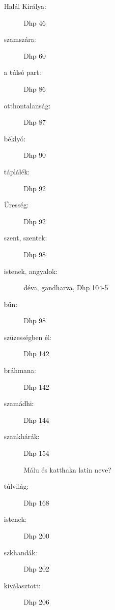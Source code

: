 \begin{description}
\item[Halál Királya:] Dhp 46


\item[szamszára:] Dhp 60


\item[a túlsó part:] Dhp 86

\item[otthontalanság:] Dhp 87


\item[béklyó:] Dhp 90

\item[táplálék:] Dhp 92

\item[Üresség:] Dhp 92

\item[szent, szentek:] Dhp 98

\item[istenek, angyalok:] déva, gandharva, Dhp 104-5


\item[bűn:] Dhp 98


\item[szüzességben él:] Dhp 142

\item[bráhmana:] Dhp 142

\item[szamádhi:] Dhp 144


\item[szankhárák:] Dhp 154


Málu és katthaka latin neve?


\item[túlvilág:] Dhp 168



\item[istenek:] Dhp 200

\item[szkhandák:] Dhp 202

\item[kiválasztott:] Dhp 206



\end{description}
